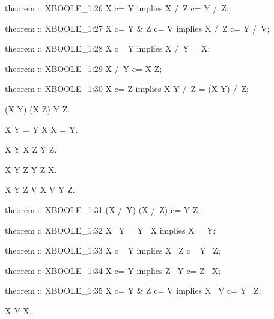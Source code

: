 \begin{paracol}{2}
\switchcolumn

\begin{mizar}
theorem :: XBOOLE_1:26
  X c= Y implies X /\ Z c= Y /\ Z;

theorem :: XBOOLE_1:27
  X c= Y & Z c= V implies 
  X /\ Z c= Y /\ V;

theorem :: XBOOLE_1:28
  X c= Y implies X /\ Y = X;

theorem :: XBOOLE_1:29
  X /\ Y c= X \/ Z;

theorem :: XBOOLE_1:30
  X c= Z implies 
  X \/ Y /\ Z = (X \/ Y) /\ Z;
\end{mizar}

\switchcolumn*\ensurevspace{5cm}

\begin{theorem}
  (X \cap Y) \cup (X \cap Z) \subset Y \cup Z.
\end{theorem}

\begin{theorem}
  X \setminus Y = Y \setminus X \implies X = Y.
\end{theorem}

\begin{theorem}
  X \subset Y \implies X \setminus Z \subset Y \setminus Z.
\end{theorem}

\begin{theorem}
  X \subset Y \implies Z \setminus Y \subset Z \setminus X.
\end{theorem}

\begin{theorem}
  X \subset Y \land Z \subset V \implies X \setminus V \subset Y \setminus Z.
\end{theorem}

\switchcolumn

\begin{mizar}
theorem :: XBOOLE_1:31
  (X /\ Y) \/ (X /\ Z) c= Y \/ Z;

theorem :: XBOOLE_1:32
  X \ Y = Y \ X implies X = Y;

theorem :: XBOOLE_1:33
  X c= Y implies X \ Z c= Y \ Z;

theorem :: XBOOLE_1:34
  X c= Y implies Z \ Y c= Z \ X;

theorem :: XBOOLE_1:35
  X c= Y & Z c= V 
  implies X \ V c= Y \ Z;
\end{mizar}

\switchcolumn*\ensurevspace{5cm}

\begin{theorem}
  X \setminus Y \subset X.
\end{theorem}


\end{paracol}

